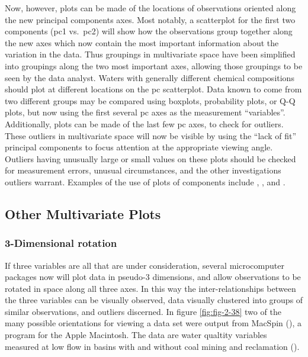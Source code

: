 \documentclass[]{book}
\begin{document}
Now, however, plots can be made of the locations of observations oriented along the new principal components axes. Most notably, a scatterplot for the first two components (pc1 vs.~pc2) will show how the observations group together along the new axes which now contain the most important information about the variation in the data. Thus groupings in multivariate space have been simplified into groupings along the two most important axes, allowing those groupings to be seen by the data analyst. Waters with generally different chemical compositions should plot at different locations on the pc scatterplot. Data known to come from two different groups may be compared using boxplots, probability plots, or Q-Q plots, but now using the first several pc axes as the measurement ``variables''. Additionally, plots can be made of the last few pc axes, to check for outliers. These outliers in multivariate space will now be visible by using the ``lack of fit'' principal components to focus attention at the appropriate viewing angle. Outliers having unusually large or small values on these plots should be checked for measurement errors, unusual circumstances, and the other investigations outliers warrant. Examples of the use of plots of components include \citet{xhoffer_chemical_1991}, \citet{meglen_evaluating_1985}, and \citet{lins_interannual_1985}.

\hypertarget{other-multivariate-plots}{%
\subsection{Other Multivariate Plots}\label{other-multivariate-plots}}

\hypertarget{dimensional-rotation}{%
\subsubsection{3-Dimensional rotation}\label{dimensional-rotation}}

If three variables are all that are under consideration, several microcomputer packages now will plot data in pseudo-3 dimensions, and allow observations to be rotated in space along all three axes. In this way the inter-relationships between the three variables can be visually observed, data visually clustered into groups of similar observations, and outliers discerned. In figure \ref{fig:fig-2-38} two of the many possible orientations for viewing a data set were output from MacSpin (\citet{donoho_macspin_1985}), a program for the Apple Macintosh. The data are water qualtity variables measured at low flow in basins with and without coal mining and reclamation (\citet{helsel_mine_1983}).
\end{document}
